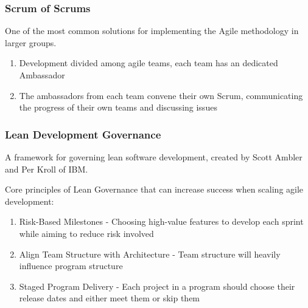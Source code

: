 \documentclass{beamer}
\begin{document}
\begin{frame}
	\frametitle{Scrum of Scrums}
	
	One of the most common solutions for implementing the Agile methodology in larger groups.
			
	\vspace{5mm}		
			
	\begin{enumerate}
		\item Development divided among agile teams, each team has an dedicated Ambassador
		\item The ambassadors from each team convene their own Scrum, communicating the progress of their own teams and discussing issues
	\end{enumerate}
	
\end{frame}


\begin{frame}
	\frametitle{Lean Development Governance}
	
	A framework for governing lean software development, created by Scott Ambler and Per Kroll of IBM.
	
	\vspace{5mm}
	
	Core principles of Lean Governance that can increase success when scaling agile development:		
	
	\vspace{3mm}
	
	\begin{enumerate}
		\item Risk-Based Milestones - Choosing high-value features to develop each sprint while aiming to reduce risk involved
		\item Align Team Structure with Architecture - Team structure will heavily influence program structure
		\item Staged Program Delivery - Each project in a program should choose their release dates and either meet them or skip them
	\end{enumerate}


\end{frame}
\end{document}
